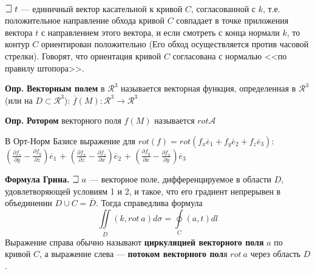  \\


$\mathLet ~ t$ --- единичный вектор касательной к кривой $C$, согласованной с $k$, т.е. положительное направление обхода кривой $C$ совпадает в точке приложения вектора $t$ с направлением этого вектора, и если смотреть с конца нормали $k$, то контур $C$ ориентирован положительно (Его обход осуществляется против часовой стрелки). Говорят, что ориентация кривой $C$ согласована с нормалью <<по правилу штопора>>.

\textbf{Опр.} \textbf{Векторным полем} в $\mathcal{R}^3$ называется векторная функция, определенная в $\mathcal{R}^3$ (или на $D \subset \mathcal{R}^3$): $\overline{f}(M): \mathcal{R}^3 \rightarrow \mathcal{R}^3$

\textbf{Опр.} \textbf{Ротором} векторного поля $f(M)$ называется $rot\mathcal{A}$

В Орт-Норм Базисе выражение для $rot(f) = rot(f_x \overline{e}_1 + f_y \overline{e}_2 + f_z \overline{e}_3):$ \newline 
$\left(\frac{\partial f_z}{\partial y} - \frac{\partial f_y}{\partial z}\right) \overline{e}_1$ + $\left(\frac{\partial f_x}{\partial z} - \frac{\partial f_z}{\partial x}\right) \overline{e}_2$ + $\left(\frac{\partial f_y}{\partial x} - \frac{\partial f_x}{\partial y}\right) \overline{e}_3$

\textbf{Формула Грина.} $\mathLet ~ a$ --- векторное поле, дифференцируемое в области $D$, удовлетворяющей условиям 1 и 2, и такое, что его градиент непрерывен в объединении $D \cup C = \overline{D}$. Тогда справедлива формула
$$\iint\limits_{\overline{D}}(k,rot~a)d\sigma = \oint\limits_{C} (a,t) dl $$
Выражение справа обычно называют \textbf{циркуляцией векторного поля} $a$ по кривой $C$, а выражение слева --- \textbf{потоком векторного пол}я $rot~a$ через область $D$.

